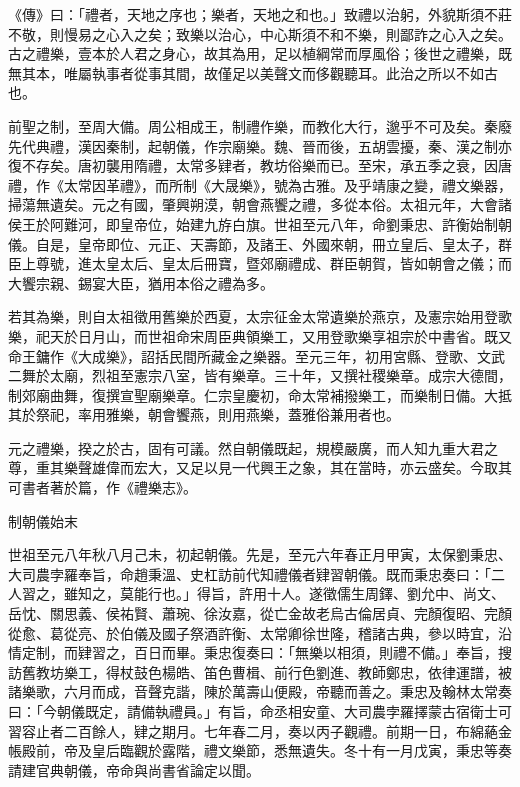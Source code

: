 
\begin{pinyinscope}

 《傳》曰：「禮者，天地之序也；樂者，天地之和也。」致禮以治躬，外貌斯須不莊不敬，則慢易之心入之矣；致樂以治心，中心斯須不和不樂，則鄙詐之心入之矣。古之禮樂，壹本於人君之身心，故其為用，足以植綱常而厚風俗；後世之禮樂，既無其本，唯屬執事者從事其間，故僅足以美聲文而侈觀聽耳。此治之所以不如古也。



 前聖之制，至周大備。周公相成王，制禮作樂，而教化大行，邈乎不可及矣。秦廢先代典禮，漢因秦制，起朝儀，作宗廟樂。魏、晉而後，五胡雲擾，秦、漢之制亦復不存矣。唐初襲用隋禮，太常多肄者，教坊俗樂而已。至宋，承五季之衰，因唐禮，作《太常因革禮》，而所制《大晟樂》，號為古雅。及乎靖康之變，禮文樂器，掃蕩無遺矣。元之有國，肇興朔漠，朝會燕饗之禮，多從本俗。太祖元年，大會諸侯王於阿難河，即皇帝位，始建九斿白旗。世祖至元八年，命劉秉忠、許衡始制朝儀。自是，皇帝即位、元正、天壽節，及諸王、外國來朝，冊立皇后、皇太子，群臣上尊號，進太皇太后、皇太后冊寶，暨郊廟禮成、群臣朝賀，皆如朝會之儀；而大饗宗親、錫宴大臣，猶用本俗之禮為多。



 若其為樂，則自太祖徵用舊樂於西夏，太宗征金太常遺樂於燕京，及憲宗始用登歌樂，祀天於日月山，而世祖命宋周臣典領樂工，又用登歌樂享祖宗於中書省。既又命王鏞作《大成樂》，詔括民間所藏金之樂器。至元三年，初用宮縣、登歌、文武二舞於太廟，烈祖至憲宗八室，皆有樂章。三十年，又撰社稷樂章。成宗大德間，制郊廟曲舞，復撰宣聖廟樂章。仁宗皇慶初，命太常補撥樂工，而樂制日備。大抵其於祭祀，率用雅樂，朝會饗燕，則用燕樂，蓋雅俗兼用者也。



 元之禮樂，揆之於古，固有可議。然自朝儀既起，規模嚴廣，而人知九重大君之尊，重其樂聲雄偉而宏大，又足以見一代興王之象，其在當時，亦云盛矣。今取其可書者著於篇，作《禮樂志》。



 制朝儀始末



 世祖至元八年秋八月己未，初起朝儀。先是，至元六年春正月甲寅，太保劉秉忠、大司農孛羅奉旨，命趙秉溫、史杠訪前代知禮儀者肄習朝儀。既而秉忠奏曰：「二人習之，雖知之，莫能行也。」得旨，許用十人。遂徵儒生周鐸、劉允中、尚文、岳忱、關思義、侯祐賢、蕭琬、徐汝嘉，從亡金故老烏古倫居貞、完顏復昭、完顏從愈、葛從亮、於伯儀及國子祭酒許衡、太常卿徐世隆，稽諸古典，參以時宜，沿情定制，而肄習之，百日而畢。秉忠復奏曰：「無樂以相須，則禮不備。」奉旨，搜訪舊教坊樂工，得杖鼓色楊皓、笛色曹楫、前行色劉進、教師鄭忠，依律運譜，被諸樂歌，六月而成，音聲克諧，陳於萬壽山便殿，帝聽而善之。秉忠及翰林太常奏曰：「今朝儀既定，請備執禮員。」有旨，命丞相安童、大司農孛羅擇蒙古宿衛士可習容止者二百餘人，肄之期月。七年春二月，奏以丙子觀禮。前期一日，布綿蕝金帳殿前，帝及皇后臨觀於露階，禮文樂節，悉無遺失。冬十有一月戊寅，秉忠等奏請建官典朝儀，帝命與尚書省論定以聞。




\end{pinyinscope}
